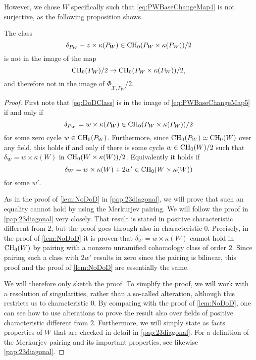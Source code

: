 However, we chose $W$ specifically such that \eqref{eq:PWBaseChangeMap4} is not surjective, as the following proposition shows.
\begin{lemma}
	\label{prop:DiagonalNotInBaseChangeImage}
	The class
	\begin{equation}
		\label{eq:DoDClass}
		\delta_{P_W} - z \times {\kappa(P_W)} \in \operatorname{CH}_0(P_W \times \kappa(P_W))/2
	\end{equation}
	is not in the image of the map
  \begin{equation}
    \label{eq:PWBaseChangeMap5}
    \operatorname{CH}_0(P_W)/2 \to \operatorname{CH}_0(P_W \times \kappa(P_W))/2,
  \end{equation}
and therefore not in the image of $\Phi_{\widetilde{\mathcal{X}},P_W}/2$.
\end{lemma}
\begin{proof}
First note that \eqref{eq:DoDClass} is in the image of \eqref{eq:PWBaseChangeMap5} if and only if 
\[\delta_{P_W} = w \times {\kappa(P_W)} \in \operatorname{CH}_0(P_W \times \kappa(P_W))/2\]
for some zero cycle $w \in \operatorname{CH}_0(P_W)$. Furthermore, since $\operatorname{CH}_0(P_W) \simeq \operatorname{CH}_0(W)$ over any field, this holds if and only if there is some cycle $w \in \operatorname{CH}_0(W)/2$ such that $\delta_W = w \times \kappa(W)$ in $\operatorname{CH}_0(W \times \kappa(W))/2$. Equivalently it holds if
\begin{equation}
	\label{eq:WEquality}
	\delta_W = w \times \kappa(W) + 2w' \in \operatorname{CH}_0(W \times \kappa(W))
\end{equation}
for some $w'$.

As in the proof of \cref{lem:NoDoD} in \cref{pap:23diagonal}, we will prove that such an equality cannot hold by using the Merkurjev pairing. We will follow the proof in \cref{pap:23diagonal} very closely. That result is stated in positive characteristic different from $2$, but the proof goes through also in characteristic $0$. Precisely, in the proof of \cref{lem:NoDoD} it is proven that $\delta_W = w \times \kappa(W)$ cannot hold in $\operatorname{CH}_0(W)$ by pairing with a nonzero unramified cohomology class of order $2$. Since pairing such a class with $2w'$ results in zero since the pairing is bilinear, this proof and the proof of \cref{lem:NoDoD} are essentially the same.

We will therefore only sketch the proof. To simplify the proof, we will work with a resolution of singularities, rather than a so-called alteration, although this restricts us to characteristic $0$. By comparing with the proof of \cref{lem:NoDoD}, one can see how to use alterations to prove the result also over fields of positive characteristic different from $2$.  Furthermore, we will simply state as facts properties of $W$ that are checked in detail in \cref{pap:23diagonal}. For a definition of the Merkurjev pairing and its important properties, see likewise \cref{pap:23diagonal}.


\end{proof}
